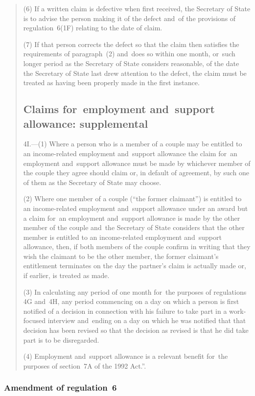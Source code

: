 \documentclass[12pt,a4paper]{article}
\begin{document}
\begin{quotation}
(6) If a written claim is defective when first received, the Secretary of State is to advise the person making it of the defect and~of the provisions of regulation~6(1F) relating to the date of claim.

(7) If that person corrects the defect so that the claim then satisfies the requirements of paragraph~(2) and~does so within one month, or~such longer period as the Secretary of State considers reasonable, of the date the Secretary of State last drew attention to the defect, the claim must be treated as having been properly made in the first instance.

\subsection*{Claims for~employment and~support allowance: supplemental}

4I.---(1)  Where a person who is a member of a couple may be entitled to an income-related employment and~support allowance the claim for~an employment and~support allowance must be made by whichever member of the couple they agree should claim or, in default of agreement, by such one of them as the Secretary of State may choose.

(2) Where one member of a couple (“the former claimant”) is entitled to an income-related employment and~support allowance under an award but a claim for~an employment and~support allowance is made by the other member of the couple and~the Secretary of State considers that the other member is entitled to an income-related employment and~support allowance, then, if both members of the couple confirm in writing that they wish the claimant to be the other member, the former claimant’s entitlement terminates on the day the partner’s claim is actually made or, if earlier, is treated as made.

(3) In calculating any period of one month for~the purposes of regulations 4G and~4H, any period commencing on a day on which a person is first notified of a decision in connection with his failure to take part in a work-focused interview and~ending on a day on which he was notified that that decision has been revised so that the decision as revised is that he did take part is to be disregarded.

(4) Employment and~support allowance is a relevant benefit for~the purposes of section~7A of the 1992 Act.”.
\end{quotation}

\subsubsection[14. Amendment of regulation~6]{Amendment of regulation~6}
\end{document}

